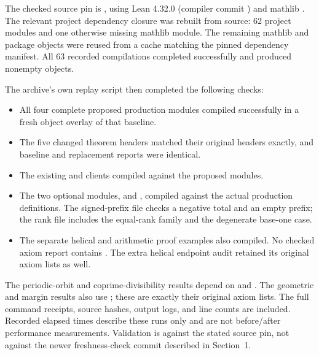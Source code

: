 The checked source pin is ,
using Lean 4.32.0 (compiler commit )
and mathlib .
The relevant project dependency closure was rebuilt from source: 62 project modules
and one otherwise missing mathlib module. The remaining mathlib and package objects
were reused from a cache matching the pinned dependency manifest. All 63 recorded
compilations completed successfully and produced nonempty objects.

The archive's own replay script then completed the following checks:
\begin{itemize}
\item All four complete proposed production modules compiled successfully in a fresh
object overlay of that baseline.
\item The five changed theorem headers matched their original headers exactly, and
baseline and replacement  reports were identical.
\item The existing  and
 clients compiled against the proposed modules.
\item The two optional modules,  and ,
compiled against the actual production definitions. The signed-prefix file checks
a negative total and an empty prefix; the rank file includes the equal-rank family
and the degenerate base-one case.
\item The separate helical and arithmetic proof examples also compiled. No checked
axiom report contains . The extra helical endpoint audit retained its
original axiom lists as well.
\end{itemize}

The periodic-orbit and coprime-divisibility results depend on  and
. The geometric and margin results also use
; these are exactly their original axiom lists.
The full command receipts, source hashes, output logs, and line counts are included.
Recorded elapsed times describe these runs only and are not before/after performance
measurements. Validation is against the stated source pin, not against the newer
freshness-check commit described in Section~1.
